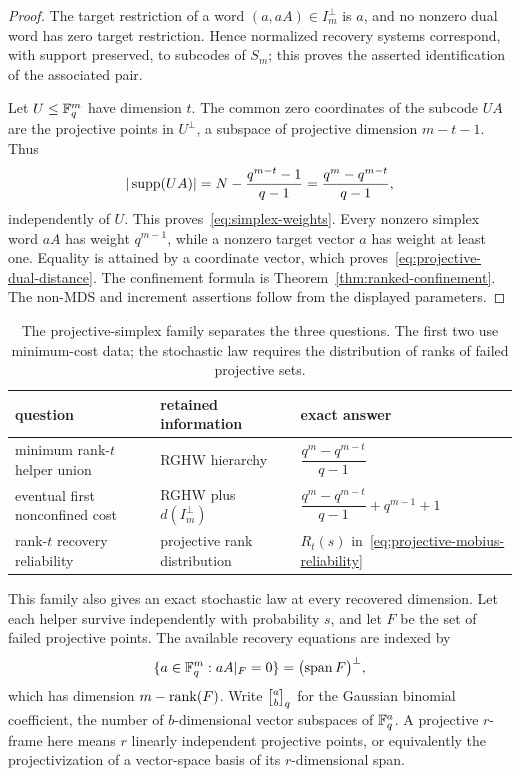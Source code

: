 \begin{proof}
The target restriction of a word $(a,aA)\in I_m^\perp$ is $a$, and no
nonzero dual word has zero target restriction.  Hence normalized recovery
systems correspond, with support preserved, to subcodes of $S_m$; this proves
the asserted identification of the associated pair.

Let $U\leq\mathbb F_q^m$ have dimension $t$.  The common zero coordinates of the
subcode $UA$ are the projective points in $U^\perp$, a subspace of projective
dimension $m-t-1$.  Thus
\[
 |\operatorname{supp}(UA)|=N-\frac{q^{m-t}-1}{q-1}
 =\frac{q^m-q^{m-t}}{q-1},
\]
independently of $U$.  This proves~\eqref{eq:simplex-weights}.  Every
nonzero simplex word $aA$ has weight $q^{m-1}$, while a nonzero target vector
$a$ has weight at least one.  Equality is attained by a coordinate vector,
which proves~\eqref{eq:projective-dual-distance}.  The confinement formula is
Theorem~\ref{thm:ranked-confinement}.  The non-MDS and increment assertions
follow from the displayed parameters.
%
%
\end{proof}

\begin{table}[H]
\centering
\small
\begin{tabular}{@{}lll@{}}
\toprule
question & retained information & exact answer\\
\midrule
minimum rank-$t$ helper union & RGHW hierarchy &
$\dfrac{q^m-q^{m-t}}{q-1}$\\[5pt]
eventual first nonconfined cost & RGHW plus $d(I_m^\perp)$ &
$\dfrac{q^m-q^{m-t}}{q-1}+q^{m-1}+1$\\[5pt]
rank-$t$ recovery reliability & projective rank distribution &
$R_t(s)$ in~\eqref{eq:projective-mobius-reliability}\\
\bottomrule
\end{tabular}
\caption{The projective-simplex family separates the three questions.  The
first two use minimum-cost data; the stochastic law requires the distribution
of ranks of failed projective sets.}
\label{tab:projective-information-levels}
\end{table}

This family also gives an exact stochastic law at every recovered dimension.
Let each helper survive independently with probability $s$, and let $F$ be
the set of failed projective points.  The available recovery equations are
indexed by
\[
 \{a\in\mathbb F_q^m:aA|_F=0\}
 =\bigl(\operatorname{span}F\bigr)^\perp,
\]
which has dimension $m-\operatorname{rank}(F)$.
Write $\qbinom ab$ for the Gaussian binomial coefficient, the number of
$b$-dimensional vector subspaces of $\mathbb F_q^a$.  A projective $r$-frame here
means $r$ linearly independent projective points, or equivalently the
projectivization of a vector-space basis of its $r$-dimensional span.

